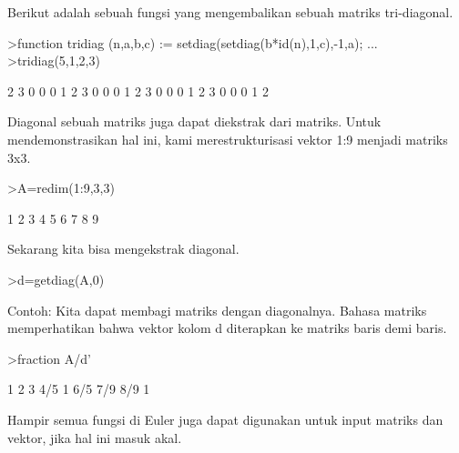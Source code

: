 \documentclass[a4paper,10pt]{article}
\begin{document}
\begin{eulernotebook}
\begin{eulercomment}
\begin{eulercomment}
\begin{eulercomment}
\begin{eulercomment}
\begin{eulercomment}
Berikut adalah sebuah fungsi yang mengembalikan sebuah matriks
tri-diagonal.
\end{eulercomment}
\begin{eulerprompt}
>function tridiag (n,a,b,c) := setdiag(setdiag(b*id(n),1,c),-1,a); ...
>tridiag(5,1,2,3)
\end{eulerprompt}
\begin{euleroutput}
              2             3             0             0             0 
              1             2             3             0             0 
              0             1             2             3             0 
              0             0             1             2             3 
              0             0             0             1             2 
\end{euleroutput}
\begin{eulercomment}
Diagonal sebuah matriks juga dapat diekstrak dari matriks. Untuk
mendemonstrasikan hal ini, kami merestrukturisasi vektor 1:9 menjadi
matriks 3x3.
\end{eulercomment}
\begin{eulerprompt}
>A=redim(1:9,3,3)
\end{eulerprompt}
\begin{euleroutput}
              1             2             3 
              4             5             6 
              7             8             9 
\end{euleroutput}
\begin{eulercomment}
Sekarang kita bisa mengekstrak diagonal.
\end{eulercomment}
\begin{eulerprompt}
>d=getdiag(A,0)
\end{eulerprompt}
\begin{euleroutput}
  [1,  5,  9]
\end{euleroutput}
\begin{eulercomment}
Contoh: Kita dapat membagi matriks dengan diagonalnya. Bahasa matriks
memperhatikan bahwa vektor kolom d diterapkan ke matriks baris demi
baris.
\end{eulercomment}
\begin{eulerprompt}
>fraction A/d'
\end{eulerprompt}
\begin{euleroutput}
          1         2         3 
        4/5         1       6/5 
        7/9       8/9         1 
\end{euleroutput}
\begin{eulercomment}
Hampir semua fungsi di Euler juga dapat digunakan untuk input matriks
dan vektor, jika hal ini masuk akal.


\end{eulercomment}
\end{eulercomment}
\end{eulercomment}
\end{eulercomment}
\end{eulercomment}
\end{eulernotebook}
\end{document}

